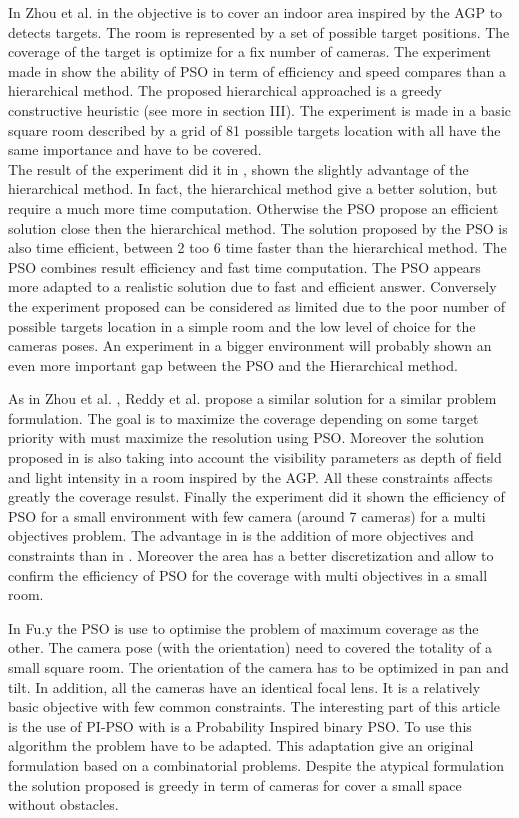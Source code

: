 In Zhou et al. in \cite{8*zhou2011} the objective is to cover an indoor area inspired by the AGP to detects targets. The room is represented by a set of possible target positions. The coverage of the target is optimize for a fix number of cameras. 
 The experiment made in \cite{8*zhou2011} show the ability of PSO in term of efficiency and speed compares than a hierarchical method. The proposed hierarchical approached is a greedy constructive heuristic (see more in \cite{8*zhou2011} section III). The experiment is made in a basic square room described by a grid of 81 possible targets location with all have the same importance and have to be covered. \\
The result of the experiment did it in \cite{8*zhou2011}, shown the slightly advantage of the hierarchical method. In fact, the hierarchical method give a better solution, but require a much more time computation.
Otherwise the PSO propose an efficient  solution close then the hierarchical method. The solution proposed by the PSO is also time efficient, between 2 too  6 time faster than the hierarchical method.  The PSO combines result efficiency and fast time computation. The PSO appears more adapted to a realistic solution due to fast and efficient answer. Conversely the experiment proposed can be considered as limited due to the  poor  number of possible targets location in a simple room and the low level of choice for the cameras poses. 
An experiment in a bigger environment will probably shown an even more important gap between the PSO and the Hierarchical method.

As in Zhou et al. \cite{8*zhou2011}, Reddy et al. \cite{33*reddy2012} propose a similar solution for a similar problem formulation. The goal is to maximize the coverage depending on some target priority with must maximize the resolution using PSO.
Moreover the solution proposed in \cite{33*reddy2012} is also taking into account the visibility parameters as depth of field and light intensity in a room inspired by the AGP. All these constraints affects greatly the coverage resulst. Finally the experiment did it shown the efficiency of PSO for a small environment with few camera (around 7 cameras) for a multi objectives problem. The advantage in \cite{33*reddy2012} is the addition of more objectives and constraints than in \cite{8*zhou2011}. Moreover the area has a better discretization and allow to confirm the efficiency of PSO for the coverage with multi objectives in a small room.

In Fu.y \cite{193*fu2014} the PSO is use to optimise the problem of maximum coverage as the other. 
 The camera pose (with the orientation) need to covered the totality of a small square room.
The orientation of the camera has to be optimized in pan and tilt. In addition, all the cameras have an identical focal lens. It is a relatively basic objective with few common constraints. 
 The interesting part of this article \cite{193*fu2014} is the use of PI-PSO with is a Probability Inspired binary PSO. 
 To use this algorithm the problem have to be adapted. This adaptation give an original formulation based on a combinatorial problems. Despite the atypical formulation the solution proposed is greedy in term of cameras for cover a small space without obstacles. 
 
